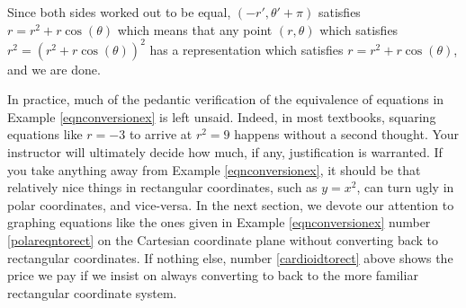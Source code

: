{\begin{enumerate}
\begin{enumerate}
\medskip

Since both sides worked out to be equal, $(-r', \theta' + \pi)$ satisfies $r = r^2 + r\cos(\theta)$ which means that any point $(r,\theta)$ which satisfies $r^2 = \left(r^2 + r\cos(\theta)\right)^2$ has a representation which satisfies  $r = r^2 + r\cos(\theta)$, and we are done. 

\end{enumerate}

\end{enumerate}
}

\medskip

In practice, much of the pedantic verification of the equivalence of equations in Example \ref{eqnconversionex} is left unsaid.  Indeed, in most textbooks, squaring equations like $r=-3$ to arrive at $r^2=9$ happens without a second thought. Your instructor will ultimately decide how much, if any, justification is warranted. If you take anything away from Example \ref{eqnconversionex}, it should be that relatively nice things in rectangular coordinates, such as $y = x^2$, can turn ugly in polar coordinates, and vice-versa.  In the next section, we devote our attention to graphing equations like the ones given in Example \ref{eqnconversionex} number \ref{polareqntorect} on the Cartesian coordinate plane without converting back to rectangular coordinates.  If nothing else, number \ref{cardioidtorect} above shows the price we pay if we insist on always converting to back to the more familiar rectangular coordinate system.

